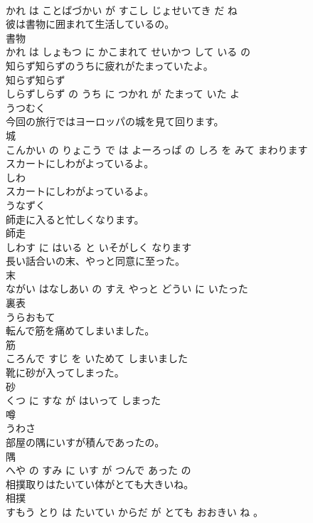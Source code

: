 \documentclass[8pt]{extreport}
\begin{document}
\begin{CJK}{UTF8}{min}
\\	かれ は ことばづかい が すこし じょせいてき だ ね			
\\	彼は書物に囲まれて生活しているの。	
\\	書物 
\\	かれ は しょもつ に かこまれて せいかつ して いる の			
\\	知らず知らずのうちに疲れがたまっていたよ。	
\\	知らず知らず 
\\	しらずしらず の うち に つかれ が たまって いた よ			
\\	うつむく	
\\	今回の旅行ではヨーロッパの城を見て回ります。	
\\	城 
\\	こんかい の りょこう で は よーろっぱ の しろ を みて まわります			
\\	スカートにしわがよっているよ。	
\\	しわ 
\\	スカートにしわがよっているよ。			
\\	うなずく	
\\	師走に入ると忙しくなります。	
\\	師走 
\\	しわす に はいる と いそがしく なります			
\\	長い話合いの末、やっと同意に至った。	
\\	末 
\\	ながい はなしあい の すえ やっと どうい に いたった			
\\	裏表	
\\	うらおもて		
\\	転んで筋を痛めてしまいました。	
\\	筋 
\\	ころんで すじ を いためて しまいました			
\\	靴に砂が入ってしまった。	
\\	砂 
\\	くつ に すな が はいって しまった			
\\	噂	
\\	うわさ		
\\	部屋の隅にいすが積んであったの。	
\\	隅 
\\	へや の すみ に いす が つんで あった の			
\\	相撲取りはたいてい体がとても大きいね。	
\\	相撲 
\\	すもう とり は たいてい からだ が とても おおきい ね 。			

\end{CJK}
\end{document}
